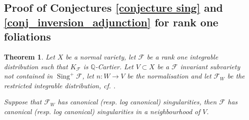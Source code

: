 \documentclass[12pt, a4paper]{amsart}
\DeclareMathOperator{\sing}{Sing}
\newcounter{Theorem}
\newtheorem{theorem}{Theorem}[section]
\theoremstyle{definition}
\theoremstyle{named}
\begin{document}
\subsection{Proof of Conjectures \ref{conjecture sing} and \ref{conj_inversion_adjunction} for rank one foliations}

\begin{theorem}
\label{thm_inversion_of_adjunction}
    Let $X$ be a normal variety, let $\mathcal F$ be a rank one integrable 
    distribution such that $K_{\mathcal F}$ is $\mathbb Q$-Cartier.  Let $V \subset X$
be a $\mathcal F$ invariant subvariety not contained in $\sing^+ \mathcal F$, 
let $n\colon W \rightarrow V$ be the normalisation and let $\mathcal F_W$
be the restricted integrable distribution, cf. \cite[Proposition-Defintion 3.12]{CS23b}.

Suppose that $\mathcal F_W$ has canonical (resp. log canonical) singularities, then $\mathcal F$ has canonical (resp. log canonical) singularities in a neighbourhood of $V$.
 \end{theorem}
\end{document}
